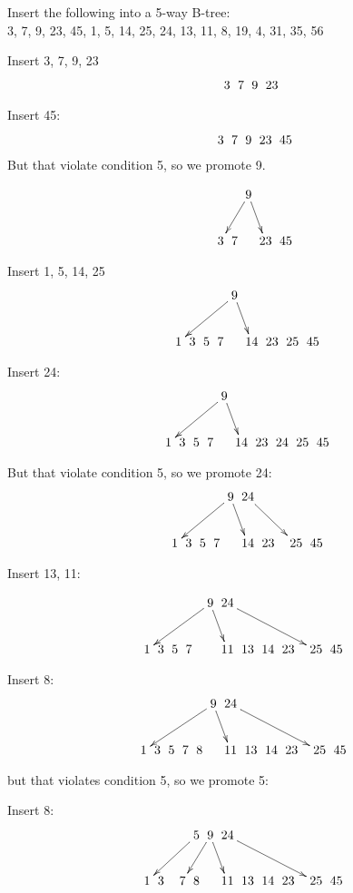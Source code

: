 \documentclass[a4paper]{article}
\begin{document}
Insert the following into a 5-way B-tree:\\
3, 7, 9, 23, 45, 1, 5, 14, 25, 24, 13, 11, 8, 19, 4, 31, 35, 56

Insert 3, 7, 9, 23
$$\xymatrix @C=0pt {
 &  &  &  &  & 3 & 7 & 9 & 23 &  \\
}$$

Insert 45:
$$\xymatrix @C=0pt {
 &  &  &  &  & 3 & 7 & 9 & 23 & 45 \\
}$$
But that violate condition 5, so we promote 9.

$$\xymatrix @C=0pt {
 &  &  &  &  &  &    &\ar[dll] 9 \ar[dr] &  &  \\
 &  &  &  &  & 3 & 7 &                  & 23 & 45 \\
}$$

Insert 1, 5, 14, 25
$$\xymatrix @C=0pt {
 &  &  &  &  &  &    &\ar[dllll] 9 \ar[dr] &  &  \\
 &  &  & 1& 3& 5 & 7 &                     & 14 & 23 & 25 & 45 \\
}$$

Insert 24:
$$\xymatrix @C=0pt {
 &  &  &  &  &  &    &\ar[dllll] 9 \ar[dr] &  &  \\
 &  &  & 1& 3& 5 & 7 &                     & 14 & 23 & 24 & 25 & 45 \\
}$$

But that violate condition 5, so we promote 24:
$$\xymatrix @C=0pt {
 &  &  &  &  &  &    &\ar[dllll] 9 \ar[dr] &           24 \ar[drrr] &  \\
 &  &  & 1& 3& 5 & 7 &                     & 14 & 23 &  & 25 & 45 \\
}$$


Insert 13, 11: 

$$\xymatrix @C=0pt {
 &  &  &  &  &  &    &\ar[dlllll] 9 \ar[dr] &           24 \ar[drrrrr] &  \\
 &  & 1& 3& 5 & 7 &   &                   & 11 & 13 & 14 & 23 &  & 25 & 45 \\
}$$

Insert 8:
$$\xymatrix @C=0pt {
 &  &  &  &  &  &    &\ar[dlllll] 9 \ar[dr] &           24 \ar[drrrrr] &  \\
 &  & 1& 3& 5 & 7 & 8  &                   & 11 & 13 & 14 & 23 &  & 25 & 45 \\
}$$

but that violates condition 5, so we promote 5:

Insert 8:
$$\xymatrix @C=0pt {
 &  &  &  &  &  & \ar[dllll] 5  &\ar[dll] 9 \ar[dr] &           24 \ar[drrrrr] &  \\
 &  & 1& 3&  & 7 & 8  &                   & 11 & 13 & 14 & 23 &  & 25 & 45 \\
}$$
\end{document}
